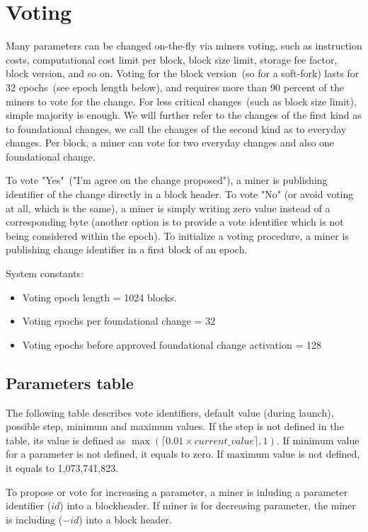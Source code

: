 \section{Voting}

Many parameters can be changed on-the-fly via miners voting, such as instruction costs, computational cost limit per block,
block size limit, storage fee factor, block version, and so on. Voting for the block version~(so for a soft-fork)
lasts for 32 epochs~(see epoch length below), and requires more than 90 percent of the miners to vote for the change.
For less critical changes~(such as block size limit), simple majority is enough. We will further refer to the changes
of the first kind as to foundational changes, we call the changes of the second kind as to everyday changes.
Per block, a miner can vote for two everyday changes and also one foundational change.

To vote "Yes"~("I'm agree on the change proposed"), a miner is publishing identifier of the change directly in a
block header. To vote "No" (or avoid voting at all, which is the same), a miner is simply writing zero value instead of
a corresponding byte (another option is to provide a vote identifier which is not being considered within the epoch).
To initialize a voting procedure, a miner is publishing change identifier in a first block of an epoch.

System constants:
\begin{itemize}
\item{} Voting epoch length = 1024 blocks.
\item{} Voting epochs per foundational change = 32
\item{} Voting epochs before approved foundational change activation = 128
\end{itemize}

\subsection{Parameters table}

The following table describes vote identifiers, default value (during launch), possible step, minimum and maximum values.
If the step is not defined in the table, its value is defined as $\max(\lceil0.01 \times current\_value\rceil, 1)$.
If minimum value for a parameter is not defined, it equals to zero. If maximum value is not defined, it equals to
1,073,741,823.

To propose or vote for increasing a parameter, a miner is inluding a parameter identifier ($id$) into a blockheader.
If miner is for decreasing parameter, the miner is including ($-id$) into a block header.

